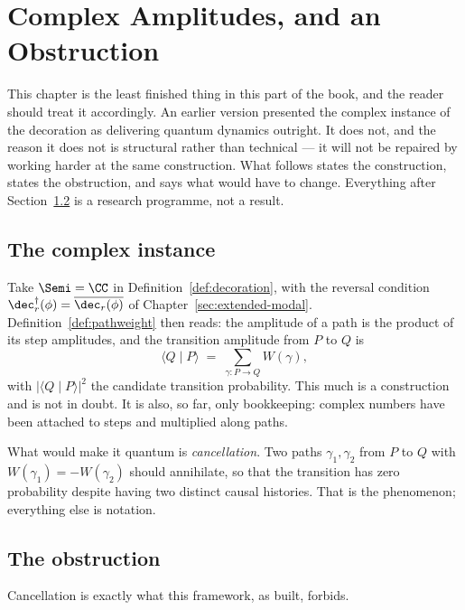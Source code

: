 \chapter{Complex Amplitudes, and an Obstruction}
\label{sec:quantum}

\begin{remark}
\label{rmk:ch09status}
This chapter is the least finished thing in this part of the book, and the
reader should treat it accordingly.  An earlier version presented the
complex instance of the decoration as delivering quantum dynamics
outright.  It does not, and the reason it does not is structural rather
than technical --- it will not be repaired by working harder at the same
construction.  What follows states the construction, states the
obstruction, and says what would have to change.  Everything after
Section~\ref{sec:obstruction} is a research programme, not a result.
\end{remark}

\section{The complex instance}

Take $\Semi = \CC$ in Definition~\ref{def:decoration}, with the reversal
condition $\dec^{\dagger}_r(\phi) = \overline{\dec_r(\phi)}$ of
Chapter~\ref{sec:extended-modal}.  Definition~\ref{def:pathweight} then
reads: the amplitude of a path is the product of its step amplitudes, and
the transition amplitude from $P$ to $Q$ is
\[
  \langle Q \mid P \rangle \;=\; \sum_{\gamma : P \to Q} W(\gamma),
\]
with $|\langle Q \mid P\rangle|^2$ the candidate transition probability.
This much is a construction and is not in doubt.  It is also, so far,
only bookkeeping: complex numbers have been attached to steps and
multiplied along paths.

What would make it quantum is \emph{cancellation}.  Two paths $\gamma_1,
\gamma_2$ from $P$ to $Q$ with $W(\gamma_1) = -W(\gamma_2)$ should
annihilate, so that the transition has zero probability despite having two
distinct causal histories.  That is the phenomenon; everything else is
notation.

\section{The obstruction}
\label{sec:obstruction}

Cancellation is exactly what this framework, as built, forbids.

